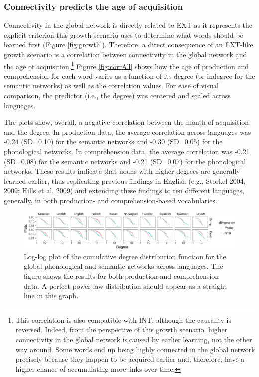 \documentclass[english,floatsintext,man]{apa6}
\theoremstyle{definition}
\theoremstyle{definition}
\theoremstyle{definition}
\theoremstyle{remark}
\begin{document}
\subsubsection{Connectivity predicts the age of
acquisition}\label{connectivity-predicts-the-age-of-acquisition}

Connectivity in the global network is directly related to EXT as it
represents the explicit criterion this growth scenario uses to determine
what words should be learned first (Figure \ref{fig:growth}). Therefore,
a direct consequence of an EXT-like growth scenario is a correlation
between connectivity in the global network and the age of
acquisition.\footnote{This correlation is also compatible with INT, although the causality is reversed. Indeed, from the perspective of this growth scenario, higher connectivity in the global network is caused by earlier learning, not the other way around. Some words end up being highly connected in the global network precisely because they happen to be acquired earlier and, therefore, have a higher chance of accumulating more links over time.}
Figure \ref{fig:corrAll} shows how the age of production and
comprehension for each word varies as a function of its degree (or
indegree for the semantic networks) as well as the correlation values.
For ease of visual comparison, the predictor (i.e., the degree) was
centered and scaled across languages.

The plots show, overall, a negative correlation between the month of
acquisition and the degree. In production data, the average correlation
across languages was -0.24 (SD=0.10) for the semantic networks and -0.30
(SD=0.05) for the phonological networks. In comprehension data, the
average correlation was -0.21 (SD=0.08) for the semantic networks and
-0.21 (SD=0.07) for the phonological networks. These results indicate
that nouns with higher degrees are generally learned earlier, thus
replicating previous findings in English (e.g., Storkel 2004, 2009;
Hills et al. 2009) and extending these findings to ten different
languages, generally, in both production- and comprehension-based
vocabularies.

\begin{figure}[!h]
\includegraphics[width=\textwidth]{ms_files/figure-latex/degreeDist-1} \caption{Log-log plot of the cumulative degree distribution function for the global phonological and semantic networks across languages. The figure shows the results for both production and comprehension data. A perfect power-law distribution should appear as a straight line in this graph.}\label{fig:degreeDist}
\end{figure}
\end{document}
